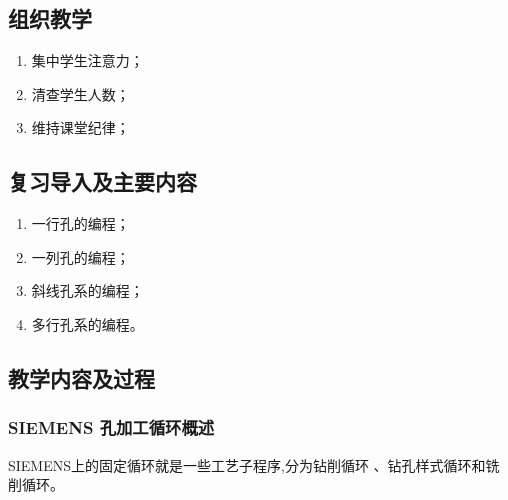 \jxhj{%
	}

\makeshouye %

\subsection{组织教学}
\begin{enumerate}[\hspace{2em}1、]
	\item 集中学生注意力；
	\item 清查学生人数；
	\item 维持课堂纪律；
\end{enumerate}

\subsection{复习导入及主要内容}
\begin{enumerate}[1、]
\item 一行孔的编程；
\item 一列孔的编程；
\item 斜线孔系的编程；
\item 多行孔系的编程。
\end{enumerate}

\subsection{教学内容及过程}
\subsubsection{SIEMENS 孔加工循环概述}
SIEMENS上的固定循环就是一些工艺子程序,分为钻削循环
、钻孔样式循环和铣削循环。

